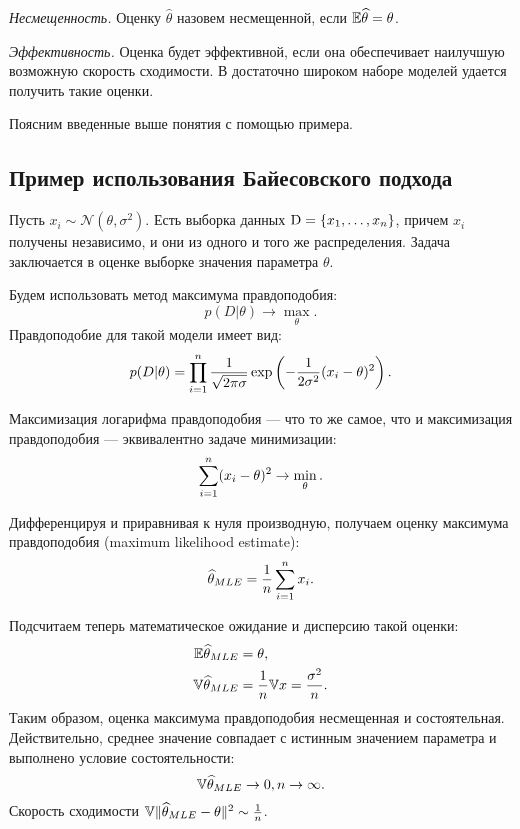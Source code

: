 \emph{Несмещенность.} Оценку $\hat{\theta}$ назовем несмещенной, если $\mathbb{E} \widehat{\theta} = \theta$.

\emph{Эффективность.} Оценка будет эффективной, если она обеспечивает наилучшую возможную скорость сходимости.
В достаточно широком наборе моделей удается получить такие оценки.

Поясним введенные выше понятия с помощью примера.

\subsection{Пример использования Байесовского подхода}
\begin{example}
Пусть $x_i \sim \mathcal{N}(\theta, \sigma^2)$.
Есть выборка данных $\mathrm{D} = \{x_1, \ldots, x_{n}\}$, причем $x_i$ получены независимо, и они из одного и того же распределения.
Задача заключается в оценке выборке значения параметра $\theta$.

Будем использовать метод максимума правдоподобия:
\[
p(D| \theta) \rightarrow \max_{\theta}.
\]
Правдоподобие для такой модели имеет вид:
\[
p(D| \theta) = \prod_{i = 1}^{n} \frac{1}{\sqrt{2 \pi \sigma}} \exp \left(-\frac{1}{2 \sigma^2} (x_i - \theta)^2 \right).
\]

Максимизация логарифма правдоподобия --- что то же самое, что и максимизация правдоподобия --- эквивалентно задаче минимизации:
\[
\sum_{i = 1}^{n} (x_i - \theta)^2 \rightarrow \min_{\theta}.
\]

Дифференцируя и приравнивая к нуля производную, получаем оценку максимума правдоподобия (maximum likelihood estimate):
\[
\widehat{\theta}_{MLE} = \frac{1}{n} \sum_{i = 1}^{n} x_i.
\]

Подсчитаем теперь математическое ожидание и дисперсию такой оценки:
\begin{align*}
\mathbb{E} \widehat{\theta}_{MLE} &= \theta, \\
\mathbb{V} \widehat{\theta}_{MLE} &= \frac{1}{n} \mathbb{V} x = \frac{\sigma^2}{n}. \\
\end{align*}
Таким образом, оценка максимума правдоподобия несмещенная и состоятельная.
Действительно, среднее значение совпадает с истинным значением параметра и выполнено условие состоятельности:
\[
\mathbb{V} \widehat{\theta}_{MLE} \rightarrow 0, n \rightarrow \infty.
\]
Скорость сходимости $\mathbb{V} \|\widehat{\theta}_{MLE} - \theta\|^2 \sim \frac{1}{n}$.


\end{example}
